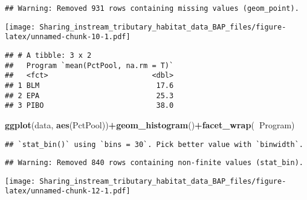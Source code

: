 \documentclass[]{article}
\newenvironment{Shaded}{\begin{snugshade}}{\end{snugshade}}
\newcommand{\DataTypeTok}[1]{\textcolor[rgb]{0.13,0.29,0.53}{#1}}
\newcommand{\KeywordTok}[1]{\textcolor[rgb]{0.13,0.29,0.53}{\textbf{#1}}}
\newcommand{\NormalTok}[1]{#1}
\newcommand{\OperatorTok}[1]{\textcolor[rgb]{0.81,0.36,0.00}{\textbf{#1}}}
\newcommand{\StringTok}[1]{\textcolor[rgb]{0.31,0.60,0.02}{#1}}
\begin{document}
\begin{verbatim}
## Warning: Removed 931 rows containing missing values (geom_point).
\end{verbatim}

\texttt{[image: Sharing\_instream\_tributary\_habitat\_data\_BAP\_files/figure-latex/unnamed-chunk-10-1.pdf]}

\begin{Shaded}
\end{Shaded}

\begin{verbatim}
## # A tibble: 3 x 2
##   Program `mean(PctPool, na.rm = T)`
##   <fct>                        <dbl>
## 1 BLM                           17.6
## 2 EPA                           25.3
## 3 PIBO                          38.0
\end{verbatim}

\begin{Shaded}
\begin{Highlighting}[]
\KeywordTok{ggplot}\NormalTok{(data, }\KeywordTok{aes}\NormalTok{(PctPool))}\OperatorTok{+}\KeywordTok{geom_histogram}\NormalTok{()}\OperatorTok{+}\KeywordTok{facet_wrap}\NormalTok{(}\OperatorTok{~}\NormalTok{Program)}
\end{Highlighting}
\end{Shaded}

\begin{verbatim}
## `stat_bin()` using `bins = 30`. Pick better value with `binwidth`.
\end{verbatim}

\begin{verbatim}
## Warning: Removed 840 rows containing non-finite values (stat_bin).
\end{verbatim}

\texttt{[image: Sharing\_instream\_tributary\_habitat\_data\_BAP\_files/figure-latex/unnamed-chunk-12-1.pdf]}
\end{document}
